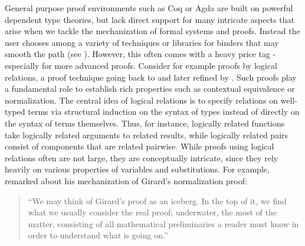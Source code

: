 General purpose proof environments such as Coq
\citep{bertot/casteran:2004} or Agda \citep{Norell:phd07} are built on
powerful dependent type theories, but lack direct support for many
intricate aspects that arise when we tackle the mechanization of
formal systems and proofs. Instead the user chooses among a variety of
techniques or libraries for binders that may smooth the path (see
\cite{Aydemir:TechReport09}). However, this often comes with a heavy price tag -
  especially for more advanced proofs.  Consider for example proofs by
  logical relations, a proof technique going back to \cite{Tait67} and
  later refined by \cite{GirardLafontTaylor:proofsAndTypes}.  Such
  proofs play a fundamental role to establish rich properties such as
  contextual equivalence or normalization.  The central idea of
  logical relations is to specify relations on well-typed terms via
  structural induction on the syntax of types instead of directly on
  the syntax of terms themselves. Thus, for instance, logically
  related functions take logically related arguments to related
  results, while logically related pairs consist of components that
  are related pairwise.  While proofs using logical relations often
  are not large, they are conceptually intricate, since they rely
  heavily on various properties of variables and substitutions.
%
%
For example,  \cite{Berardi:WLF90} remarked about his mechanization of Girard's normalization proof:
\begin{quote}
``We may think of Girard's proof as an iceberg. In the top of it, we find what we usually consider the real proof; underwater, the most  of the matter, consisting of all mathematical preliminaries a reader must know in order to understand what is going on.''
\end{quote}


